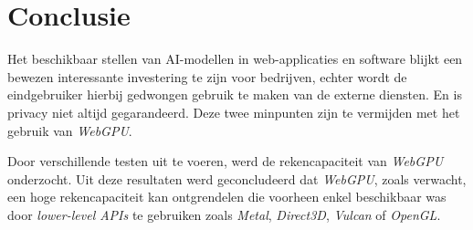 
\chapter{Conclusie}%
\label{ch:conclusie}





\iffalse
TODO Samen hang moet worden verbetert, alle zaken die hier besproken zijn geweest moeten zeker aan bod zijn gekomen in het onderzoek! Al dan niet verder in detail bespreken.
\fi

Het beschikbaar stellen van AI-modellen in web-applicaties en software blijkt een bewezen interessante investering te zijn voor bedrijven, echter wordt de eindgebruiker hierbij gedwongen gebruik te maken van de externe diensten. En is privacy niet altijd gegarandeerd. Deze twee minpunten zijn te vermijden met het gebruik van \textit{WebGPU}.

\bigbreak{}

Door verschillende testen uit te voeren, werd de rekencapaciteit van \textit{WebGPU} onderzocht. Uit deze resultaten werd geconcludeerd dat \textit{WebGPU}, zoals verwacht, een hoge rekencapaciteit kan ontgrendelen die voorheen enkel beschikbaar was door \textit{lower-level APIs} te gebruiken zoals \textit{Metal}, \textit{Direct3D}, \textit{Vulcan} of \textit{OpenGL}.

